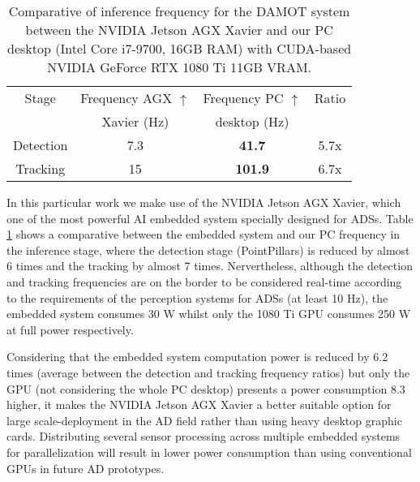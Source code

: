 \begin{table}[h]
	\captionsetup{justification=justified}
	\caption[Comparative of inference frequency for the \ac{DAMOT} system between the NVIDIA Jetson AGX Xavier and our PC desktop]{Comparative of inference frequency for the \ac{DAMOT} system between the NVIDIA Jetson AGX Xavier and our PC desktop (Intel Core i7-9700, 16GB RAM) with CUDA-based NVIDIA GeForce RTX 1080 Ti 11GB VRAM.}
	\label{table:4_smartmot_xavier_vs_computer_hz}
	\begin{center}
		\begin{tabular}{ c | c c c}
			\toprule
			Stage & Frequency AGX $\uparrow$ &  Frequency PC $\uparrow$ & Ratio \\
			& Xavier (Hz) & desktop (Hz) & \\
			\midrule
			Detection & 7.3 & \bf{41.7} & 5.7x \\
			\hline
			Tracking & 15 & \bf{101.9} & 6.7x \\
			\bottomrule
		\end{tabular}
	\end{center}
\end{table}

In this particular work we make use of the NVIDIA Jetson AGX Xavier, which one of the most powerful \ac{AI} embedded system specially designed for \acp{ADS}. Table \ref{table:4_smartmot_xavier_vs_computer_hz} shows a comparative between the embedded system and our PC frequency in the inference stage, where the detection stage (PointPillars) is reduced by almost 6 times and the tracking by almost 7 times. Nervertheless, although the detection and tracking frequencies are on the border to be considered real-time according to the requirements of the perception systems for \acp{ADS} (at least 10 Hz), the embedded system consumes 30 W whilst only the 1080 Ti GPU consumes 250 W at full power respectively. 

Considering that the embedded system computation power is reduced by 6.2 times (average between the detection and tracking frequency ratios) but only the \ac{GPU} (not considering the whole PC desktop) presents a power consumption 8.3 higher, it makes the NVIDIA Jetson AGX Xavier a better suitable option for large scale-deployment in the \ac{AD} field rather than using heavy desktop graphic cards. Distributing several sensor processing across multiple embedded systems for parallelization will result in lower power consumption than using conventional \acp{GPU} in future \ac{AD} prototypes. 

